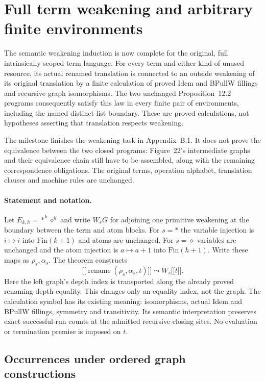 \clearpage
\section{Full term weakening and arbitrary finite environments}
\label{sec:term-semantic-weakening}
The semantic weakening induction is now complete for the original, full
intrinsically scoped term language. For every term and either kind of unused
resource, its actual renamed translation is connected to an outside weakening
of its original translation by a finite calculation of proved Idem and BPullW
fillings and recursive graph isomorphisms. The two unchanged Proposition~12.2
programs consequently satisfy this law in every finite pair of environments,
including the named distinct-list boundary. These are proved calculations,
not hypotheses asserting that translation respects weakening.

The milestone finishes the weakening task in Appendix~B.1. It does not prove
the equivalence between the two closed programs: Figure~22's intermediate
graphs and their equivalence chain still have to be assembled, along with the
remaining correspondence obligations. The original terms, operation alphabet,
translation clauses and machine rules are unchanged.

\paragraph{Statement and notation.}
Let $E_{k,h}=*^k\diamond^h$ and write $W_sG$ for adjoining one primitive
weakening at the boundary between the term and atom blocks. For $s=*$ the
variable injection is $i\mapsto i$ into $\mathrm{Fin}(k+1)$ and atoms are
unchanged. For $s=\diamond$ variables are unchanged and the atom injection is
$a\mapsto a+1$ into $\mathrm{Fin}(h+1)$. Write these maps as $\rho_s,\alpha_s$.
The theorem constructs
\[
 \lbrack\!\lbrack\operatorname{rename}(\rho_s,\alpha_s,t)\rbrack\!\rbrack
 \leadsto W_s\lbrack\!\lbrack t\rbrack\!\rbrack.
\]
Here the left graph's depth index is transported along the already proved
renaming-depth equality. This changes only an equality index, not the graph.
The calculation symbol has its existing meaning: isomorphisms, actual Idem
and BPullW fillings, symmetry and transitivity. Its semantic interpretation
preserves exact successful-run counts at the admitted recursive closing sites.
No evaluation or termination premise is imposed on $t$.

\subsection{Occurrences under ordered graph constructions}


